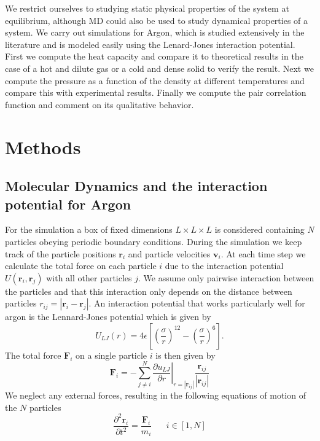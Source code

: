 \documentclass[twoside]{article}
\begin{document}
We restrict ourselves to studying static physical properties of the system at equilibrium, although MD could also be used to study dynamical properties of a system. We carry out simulations for Argon, which is studied extensively in the literature and is modeled easily using the Lenard-Jones interaction potential. First we compute the heat capacity and compare it to theoretical results in the case of a hot and dilute gas or a cold and dense solid to verify the result. Next we compute the pressure as a function of the density at different temperatures and compare this with experimental results. Finally we compute the pair correlation function and comment on its qualitative behavior.


\section{Methods}
\subsection{Molecular Dynamics and the interaction potential for Argon}
For the simulation a box of fixed dimensions $L\times L\times L$ is considered containing $N$ particles obeying periodic boundary conditions. During the simulation we keep track of the particle positions $\mathbf{r}_i$ and particle velocities $\mathbf{v}_i$. At each time step we calculate the total force on each particle $i$ due to the interaction potential $U(\mathbf{r}_i,\mathbf{r}_j)$ with all other particles $j$.  
We assume only pairwise interaction between the particles and that this interaction only depends on the distance between particles $r_{ij} = | \mathbf{r}_i - \mathbf{r}_j |$. An interaction potential that works particularly well for argon is the Lennard-Jones potential which is given by
\begin{equation}\label{eq_lj}
U_{LJ}(r) = 4\epsilon \left[\left(\frac{\sigma}{r}\right)^{12} - \left(\frac{\sigma}{r}\right)^6  \right].
\end{equation}
The total force  $\mathbf{F}_i$  on a single particle $i$ is then given by 
\begin{equation}\label{eq_force_sum}
\mathbf{F}_i = -\sum_{j\not=i}^N \left.\frac{\partial u_{LJ}}{\partial r}\right|_{r= |\mathbf{r}_{ij}|}  \frac{\mathbf{r}_{ij}}{|\mathbf{r}_{ij}|}
\end{equation}
We neglect any external forces, resulting in the following equations of motion of the $N$ particles
\begin{equation}\label{eq_motion}
\frac{\partial ^2\mathbf{r}_i}{\partial t^2} = \frac{\mathbf{F}_i}{m_i} \hspace{20pt} i\in [1, N]
\end{equation}
\end{document}
